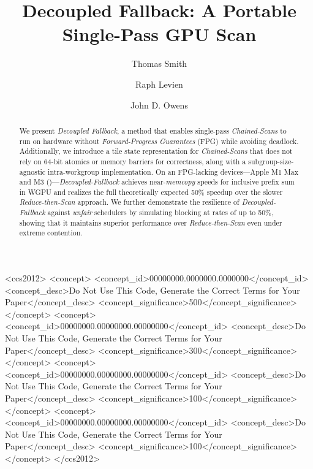 \documentclass[sigconf]{acmart}
\begin{document}
\title{Decoupled Fallback: A Portable Single-Pass GPU Scan}

\author{Thomas Smith}

\author{Raph Levien}

\author{John D. Owens}

\renewcommand{\shortauthors}{Smith et al.}

\begin{abstract}
  We present \emph{Decoupled Fallback}, a method that enables single-pass \emph{Chained-Scans} to run on hardware without \emph{Forward-Progress Guarantees} (FPG) while avoiding deadlock. Additionally, we introduce a tile state representation for \emph{Chained-Scans} that does not rely on 64-bit atomics or memory barriers for correctness, along with a subgroup-size-agnostic intra-workgroup implementation. On an FPG-lacking devices---Apple M1 Max and M3 ()---\emph{Decoupled-Fallback} achieves near-\emph{memcopy} speeds for inclusive prefix sum in WGPU and realizes the full theoretically expected 50\% speedup over the slower \emph{Reduce-then-Scan} approach. We further demonstrate the resilience of \emph{Decoupled-Fallback} against \emph{unfair} schedulers by simulating blocking at rates of up to 50\%, showing that it maintains superior performance over \emph{Reduce-then-Scan} even under extreme contention.
\end{abstract}

\begin{CCSXML}
  <ccs2012>
  <concept>
  <concept_id>00000000.0000000.0000000</concept_id>
  <concept_desc>Do Not Use This Code, Generate the Correct Terms for Your Paper</concept_desc>
  <concept_significance>500</concept_significance>
  </concept>
  <concept>
  <concept_id>00000000.00000000.00000000</concept_id>
  <concept_desc>Do Not Use This Code, Generate the Correct Terms for Your Paper</concept_desc>
  <concept_significance>300</concept_significance>
  </concept>
  <concept>
  <concept_id>00000000.00000000.00000000</concept_id>
  <concept_desc>Do Not Use This Code, Generate the Correct Terms for Your Paper</concept_desc>
  <concept_significance>100</concept_significance>
  </concept>
  <concept>
  <concept_id>00000000.00000000.00000000</concept_id>
  <concept_desc>Do Not Use This Code, Generate the Correct Terms for Your Paper</concept_desc>
  <concept_significance>100</concept_significance>
  </concept>
  </ccs2012>
\end{CCSXML}
\end{document}
